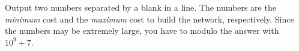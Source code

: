 Output two numbers separated by a blank in a line.
The numbers are the \emph{minimum} cost and the \emph{maximum} cost to build 
the network, respectively. 
Since the numbers may be extremely large, you have to modulo the answer with 
$10^9 + 7$.
